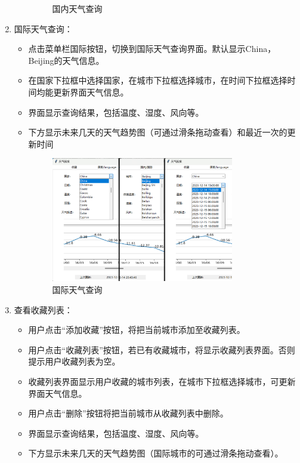 \documentclass[UTF8]{ctexart}
\begin{document}
\begin{enumerate}
\begin{itemize}
\begin{figure}[H]
               \caption{国内天气查询}
            \end{figure}
         \end{itemize}
   \item 国际天气查询：
         \begin{itemize}
            \item 点击菜单栏国际按钮，切换到国际天气查询界面。默认显示China，Beijing的天气信息。
            \item 在国家下拉框中选择国家，在城市下拉框选择城市，在时间下拉框选择时间均能更新界面天气信息。
            \item 界面显示查询结果，包括温度、湿度、风向等。
            \item 下方显示未来几天的天气趋势图（可通过滑条拖动查看）和最近一次的更新时间
            \begin{figure}[H]
               \centering
               \includegraphics[width=0.8\textwidth]{picb3.png}
               \caption{国际天气查询}
            \end{figure}
         \end{itemize}
   \item 查看收藏列表：
         \begin{itemize}
            \item 用户点击“添加收藏”按钮，将把当前城市添加至收藏列表。
            \item 用户点击“收藏列表”按钮，若已有收藏城市，将显示收藏列表界面。否则提示用户收藏列表为空。
            \item 收藏列表界面显示用户收藏的城市列表，在城市下拉框选择城市，可更新界面天气信息。
            \item 用户点击“删除”按钮将把当前城市从收藏列表中删除。
            \item 界面显示查询结果，包括温度、湿度、风向等。
            \item 下方显示未来几天的天气趋势图（国际城市的可通过滑条拖动查看）。

\end{itemize}
\end{enumerate}
\end{document}
